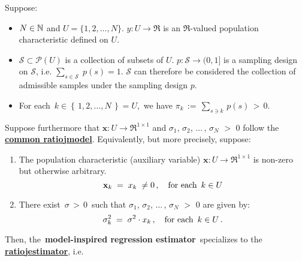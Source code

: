 \begin{proposition}\label{commonRatioYieldsRatioEstimator}
\mbox{}
\vskip 0.05cm
\noindent
Suppose:
\begin{itemize}
\item
	$N \in \mathbb{N}$ and $U = \{1,2,\ldots,N\}$.
	\vskip 0.05cm
	$y : U \longrightarrow \Re$ is an $\Re$-valued population characteristic defined on $U$.
\item
	$\mathcal{S} \subset \mathcal{P}(U)$ is a collection of subsets of $U$.
	$p : \mathcal{S} \longrightarrow (0,1]$ is a sampling design on $\mathcal{S}$,
	i.e. $\underset{s\in\mathcal{S}}{\sum}\;p(s) = 1$.
	\vskip 0.05cm
	$\mathcal{S}$ can therefore be considered the collection of admissible samples under the sampling design $p$.
\item
	For each \,$k \in \left\{\,1,2,\ldots,N\,\right\} = U$,\, we have
	$\pi_{k} \,:=\, \underset{s \ni k}{\sum}\,p(s) \,>\, 0$.
\end{itemize}
Suppose furthermore that
$\mathbf{x} : U \longrightarrow \Re^{1 \times 1}$ and
$\sigma_{1}$, $\sigma_{2}$, $\ldots$\,, $\sigma_{N}$ $>$ $0$
follow the \,\underline{\textbf{{\color{red}common ratio}{\color{white}j}model}}.
\renewcommand{\theenumi}{\alph{enumi}}
\renewcommand{\labelenumi}{\textnormal{(\theenumi)}$\;\;$}
\vskip 0.1cm
\noindent
Equivalently, but more precisely, suppose:
\begin{enumerate}
\item \vskip -0.10cm
	The population characteristic (auxiliary variable)
	$\mathbf{x} : U \longrightarrow \Re^{1 \times 1}$ is non-zero but otherwise arbitrary.
	\begin{equation*}
	\mathbf{x}_{k}
		\; = \; x_{k}
		\; \neq 0\,,
	\quad\textnormal{for each \,$k \in U$}
	\end{equation*}
\item
	There exist \,$\sigma \,>\, 0$\, such that
	$\sigma_{1}$, $\sigma_{2}$, $\ldots$\,, $\sigma_{N}$ $>$ $0$ are given by:
	\begin{equation*}
	\sigma_{k}^{2} \; = \; \sigma^{2} \cdot x_{k}\,,
	\quad\textnormal{for each \,$k \in U$}\,.
	\end{equation*}
\end{enumerate}
\renewcommand{\theenumi}{\roman{enumi}}
\renewcommand{\labelenumi}{\textnormal{(\theenumi)}$\;\;$}
Then, the \,\textbf{model-inspired regression estimator}\,
specializes to the \,\underline{\textbf{{\color{red}ratio}{\color{white}j}estimator}}, i.e.

\end{proposition}
